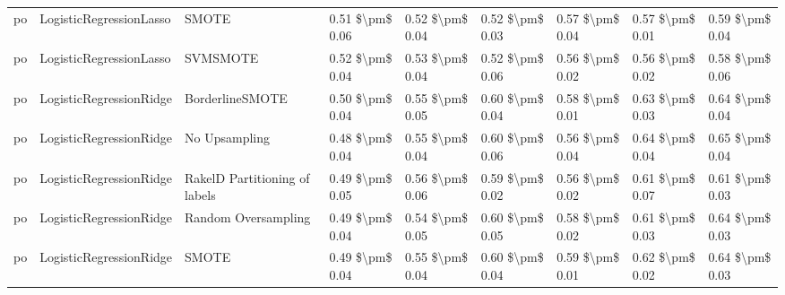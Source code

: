 \begin{tabular}{lllllllll}
      po &         LogisticRegressionLasso &                         SMOTE & 0.51 \$\textbackslash pm\$ 0.06 &           0.52 \$\textbackslash pm\$ 0.04 &       0.52 \$\textbackslash pm\$ 0.03 &        0.57 \$\textbackslash pm\$ 0.04 &                         0.57 \$\textbackslash pm\$ 0.01 &     0.59 \$\textbackslash pm\$ 0.04 \\
      po &         LogisticRegressionLasso &                      SVMSMOTE & 0.52 \$\textbackslash pm\$ 0.04 &           0.53 \$\textbackslash pm\$ 0.04 &       0.52 \$\textbackslash pm\$ 0.06 &        0.56 \$\textbackslash pm\$ 0.02 &                         0.56 \$\textbackslash pm\$ 0.02 &     0.58 \$\textbackslash pm\$ 0.06 \\
      po &         LogisticRegressionRidge &               BorderlineSMOTE & 0.50 \$\textbackslash pm\$ 0.04 &           0.55 \$\textbackslash pm\$ 0.05 &       0.60 \$\textbackslash pm\$ 0.04 &        0.58 \$\textbackslash pm\$ 0.01 &                         0.63 \$\textbackslash pm\$ 0.03 &     0.64 \$\textbackslash pm\$ 0.04 \\
      po &         LogisticRegressionRidge &                 No Upsampling & 0.48 \$\textbackslash pm\$ 0.04 &           0.55 \$\textbackslash pm\$ 0.04 &       0.60 \$\textbackslash pm\$ 0.06 &        0.56 \$\textbackslash pm\$ 0.04 &                         0.64 \$\textbackslash pm\$ 0.04 &     0.65 \$\textbackslash pm\$ 0.04 \\
      po &         LogisticRegressionRidge & RakelD Partitioning of labels & 0.49 \$\textbackslash pm\$ 0.05 &           0.56 \$\textbackslash pm\$ 0.06 &       0.59 \$\textbackslash pm\$ 0.02 &        0.56 \$\textbackslash pm\$ 0.02 &                         0.61 \$\textbackslash pm\$ 0.07 &     0.61 \$\textbackslash pm\$ 0.03 \\
      po &         LogisticRegressionRidge &           Random Oversampling & 0.49 \$\textbackslash pm\$ 0.04 &           0.54 \$\textbackslash pm\$ 0.05 &       0.60 \$\textbackslash pm\$ 0.05 &        0.58 \$\textbackslash pm\$ 0.02 &                         0.61 \$\textbackslash pm\$ 0.03 &     0.64 \$\textbackslash pm\$ 0.03 \\
      po &         LogisticRegressionRidge &                         SMOTE & 0.49 \$\textbackslash pm\$ 0.04 &           0.55 \$\textbackslash pm\$ 0.04 &       0.60 \$\textbackslash pm\$ 0.04 &        0.59 \$\textbackslash pm\$ 0.01 &                         0.62 \$\textbackslash pm\$ 0.02 &     0.64 \$\textbackslash pm\$ 0.03 \\

\end{tabular}
